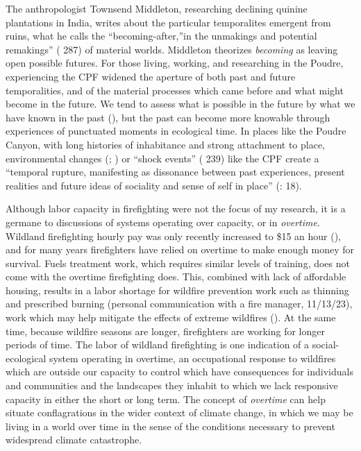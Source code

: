 \documentclass[
]{article}
\begin{document}
The anthropologist Townsend Middleton, researching declining quinine plantations in India, writes about the particular temporalites emergent from ruins, what he calls the ``becoming-after,''in the unmakings and potential remakings'' ( 287) of material worlds. Middleton theorizes \emph{becoming} as leaving open possible futures. For those living, working, and researching in the Poudre, experiencing the CPF widened the aperture of both past and future temporalities, and of the material processes which came before and what might become in the future. We tend to assess what is possible in the future by what we have known in the past (), but the past can become more knowable through experiences of punctuated moments in ecological time. In places like the Poudre Canyon, with long histories of inhabitance and strong attachment to place, environmental changes (; ) or ``shock events'' ( 239) like the CPF create a ``temporal rupture, manifesting as dissonance between past experiences, present realities and future ideas of sociality and sense of self in place'' (: 18).

Although labor capacity in firefighting were not the focus of my research, it is a germane to discussions of systems operating over capacity, or in \emph{overtime}. Wildland firefighting hourly pay was only recently increased to \$15 an hour (), and for many years firefighters have relied on overtime to make enough money for survival. Fuels treatment work, which requires similar levels of training, does not come with the overtime firefighting does. This, combined with lack of affordable housing, results in a labor shortage for wildfire prevention work such as thinning and prescribed burning (personal communication with a fire manager, 11/13/23), work which may help mitigate the effects of extreme wildfires (). At the same time, because wildfire seasons are longer, firefighters are working for longer periods of time. The labor of wildland firefighting is one indication of a social-ecological system operating in overtime, an occupational response to wildfires which are outside our capacity to control which have consequences for individuals and communities and the landscapes they inhabit to which we lack responsive capacity in either the short or long term. The concept of \emph{overtime} can help situate conflagrations in the wider context of climate change, in which we may be living in a world over time in the sense of the conditions necessary to prevent widespread climate catastrophe.
\end{document}
